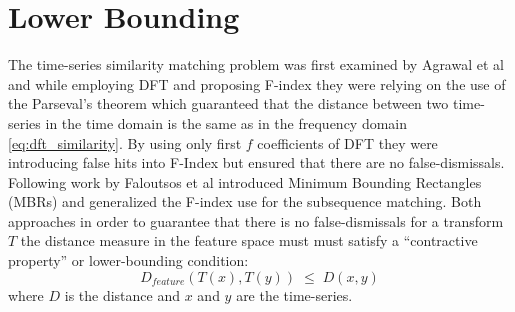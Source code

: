 \section{Lower Bounding}
The time-series similarity matching problem was first examined by Agrawal et al \cite{citeulike:3973409} and while employing DFT and proposing F-index they were relying on the use of the Parseval's theorem which guaranteed that the distance between two time-series in the time domain is the same as in the frequency domain \ref{eq:dft_similarity}. By using only first $f$ coefficients of DFT they were introducing false hits into F-Index but ensured that there are no false-dismissals. Following work by Faloutsos et al \cite{citeulike:825581} introduced Minimum Bounding Rectangles (MBRs) and generalized the F-index use for the subsequence matching. Both approaches in order to guarantee that there is no false-dismissals for a transform $T$ the distance measure in the feature space must must satisfy a ``contractive property'' or lower-bounding condition:
\begin{equation}
D_{feature}(T(x),T(y)) \; \leq \; D(x,y) 
\label{eq:bounding}
\end{equation}
where $D$ is the distance and $x$ and $y$ are the time-series.
